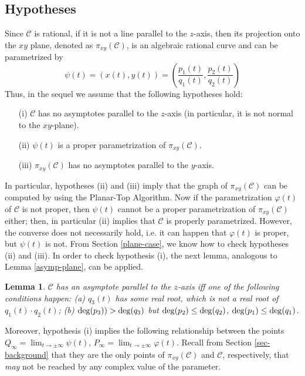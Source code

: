 \documentclass{elsart}
\def\deg{{\rm deg}}
\newtheorem{lemma}[theorem]{{\bf Lemma}}
\begin{document}
\subsection{Hypotheses}\label{hyp-3d}

Since $\mathcal C$ is rational, if it is not a line parallel to
the $z$-axis, then its projection onto the $xy$ plane, denoted as
$\pi_{xy}({\mathcal C})$, is an algebraic rational curve and can
be parametrized by
\[\psi(t)=(x(t),y(t))=\left(\displaystyle{\frac{p_1(t)}{q_1(t)}},\displaystyle{\frac{p_2(t)}{q_2(t)}}\right)\]
Thus, in the sequel we assume that the following hypotheses hold:

\begin{itemize}
\item [(i)] ${\mathcal C}$ has no asymptotes parallel to the $z$-axis (in particular, it is not normal to the $xy$-plane).
\item [(ii)] $\psi(t)$ is a proper parametrization of $\pi_{xy}({\mathcal C})$.
\item [(iii)] $\pi_{xy}({\mathcal C})$ has no asymptotes parallel to the $y$-axis.
\end{itemize}

In particular, hypotheses (ii) and (iii) imply that the graph of
$\pi_{xy}({\mathcal C})$ can be computed by using the Planar-Top
Algorithm. Now if the  parametrization $\varphi(t)$ of ${\mathcal
C}$ is not proper, then $\psi(t)$ cannot be a proper
parametrization of $\pi_{xy}({\mathcal C})$ either; then, in
particular (ii) implies that ${\mathcal C}$ is properly
parametrized. However, the converse does not necessarily hold,
i.e. it can happen that $\varphi(t)$ is proper, but $\psi(t)$ is
not. From Section \ref{plane-case}, we know how to check
hypotheses (ii) and (iii). In order to check hypothesis (i), the
next lemma, analogous to Lemma \ref{asymp-plane}, can be applied.

\begin{lemma} \label{asint-space}
${\mathcal C}$ has an asymptote parallel to the $z$-axis iff one of the following conditions happen: (a) $q_3(t)$ has some real root, which is not a real root of $q_1(t)\cdot q_2(t)$; (b) $\deg(p_3))>\deg(q_3)$ but $\deg(p_2)\leq \deg(q_2)$, $\deg(p_1)\leq \deg(q_1)$.
\end{lemma}

Moreover, hypothesis (i) implies the following relationship between the points $Q_{\infty}=\lim_{t\to \pm \infty}\psi(t)$, $P_{\infty}=\lim_{t\to \pm \infty}\varphi(t)$. Recall from Section \ref{sec-background} that they are the only points of $\pi_{xy}({\mathcal C})$ and ${\mathcal C}$, respectively, that {\it may} not be reached by any complex value of the parameter.
\end{document}
